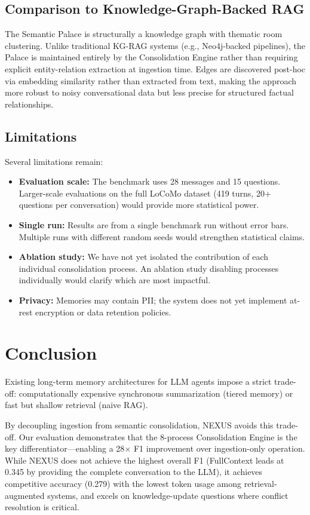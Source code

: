 \documentclass[conference]{IEEEtran}
\begin{document}
\subsection{Comparison to Knowledge-Graph-Backed RAG}
The Semantic Palace is structurally a knowledge graph with thematic room clustering. Unlike traditional KG-RAG systems (e.g., Neo4j-backed pipelines), the Palace is maintained entirely by the Consolidation Engine rather than requiring explicit entity-relation extraction at ingestion time. Edges are discovered post-hoc via embedding similarity rather than extracted from text, making the approach more robust to noisy conversational data but less precise for structured factual relationships.

\subsection{Limitations}
Several limitations remain:
\begin{itemize}
    \item \textbf{Evaluation scale:} The benchmark uses 28 messages and 15 questions. Larger-scale evaluations on the full LoCoMo dataset (419 turns, 20+ questions per conversation) would provide more statistical power.
    \item \textbf{Single run:} Results are from a single benchmark run without error bars. Multiple runs with different random seeds would strengthen statistical claims.
    \item \textbf{Ablation study:} We have not yet isolated the contribution of each individual consolidation process. An ablation study disabling processes individually would clarify which are most impactful.
    \item \textbf{Privacy:} Memories may contain PII; the system does not yet implement at-rest encryption or data retention policies.
\end{itemize}

\section{Conclusion}

Existing long-term memory architectures for LLM agents impose a strict trade-off: computationally expensive synchronous summarization (tiered memory) or fast but shallow retrieval (naive RAG).

By decoupling ingestion from semantic consolidation, NEXUS avoids this trade-off. Our evaluation demonstrates that the 8-process Consolidation Engine is the key differentiator---enabling a 28$\times$ F1 improvement over ingestion-only operation. While NEXUS does not achieve the highest overall F1 (FullContext leads at 0.345 by providing the complete conversation to the LLM), it achieves competitive accuracy (0.279) with the lowest token usage among retrieval-augmented systems, and excels on knowledge-update questions where conflict resolution is critical.
\end{document}
